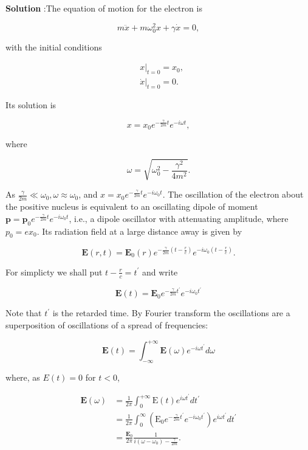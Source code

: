 \documentclass[10pt]{article}
\begin{document}
\textbf{Solution} :The equation of motion for the electron is

$$
m \ddot{x}+m \omega_{0}^{2} x+\gamma \dot{x}=0,
$$

with the initial conditions

$$
\begin{aligned}
&\left.x\right|_{t=0}=x_{0}, \\
&\left.\dot{x}\right|_{t=0}=0 .
\end{aligned}
$$

Its solution is

$$
x=x_{0} e^{-\frac{\gamma}{2 m} t} e^{-i \omega t},
$$

where

$$
\omega=\sqrt{\omega_{0}^{2}-\frac{\gamma^{2}}{4 m^{2}}} .
$$

As $\frac{\gamma}{2 m} \ll \omega_{0}, \omega \approx \omega_{0}$, and $x=x_{0} e^{-\frac{\gamma}{2 m} t} e^{-i \omega_{0} t}$. The oscillation of the electron about the positive nucleus is equivalent to an oscillating dipole of moment $\mathbf{p}=\mathbf{p}_{0} e^{-\frac{\gamma}{2 m} t} e^{-i \omega_{0} t}$, i.e., a dipole oscillator with attenuating amplitude, where $p_{0}=e x_{0}$. Its radiation field at a large distance away is given by

$$
\mathbf{E}(r, t)=\mathbf{E}_{0}(r) e^{-\frac{\gamma}{2 m}\left(t-\frac{r}{c}\right)} e^{-i \omega_{0}\left(t-\frac{r}{c}\right)} .
$$

For simplicty we shall put $t-\frac{r}{c}=t^{\prime}$ and write

$$
\mathbf{E}(t)=\mathbf{E}_{0} e^{-\frac{\gamma}{2 m} t^{\prime}} e^{-i \omega_{0} t^{\prime}}
$$

Note that $t^{\prime}$ is the retarded time. By Fourier transform the oscillations are a superposition of oscillations of a spread of frequencies:

$$
\mathbf{E}(t)=\int_{-\infty}^{+\infty} \mathbf{E}(\omega) e^{-i \omega t^{\prime}} d \omega
$$

where, as $E(t)=0$ for $t<0$,

$$
\begin{aligned}
\mathbf{E}(\omega) &=\frac{1}{2 \pi} \int_{0}^{+\infty} \mathrm{E}(t) e^{i \omega t^{\prime}} d t^{\prime} \\
&=\frac{1}{2 \pi} \int_{0}^{\infty}\left(\mathrm{E}_{0} e^{-\frac{\gamma}{2 m} t^{\prime}} e^{-i \omega_{0} t^{\prime}}\right) e^{i \omega t^{\prime}} d t^{\prime} \\
&=\frac{\mathbf{E}_{0}}{2 \pi} \frac{1}{i\left(\omega-\omega_{0}\right)-\frac{\gamma}{2 m}} .
\end{aligned}
$$
\end{document}
